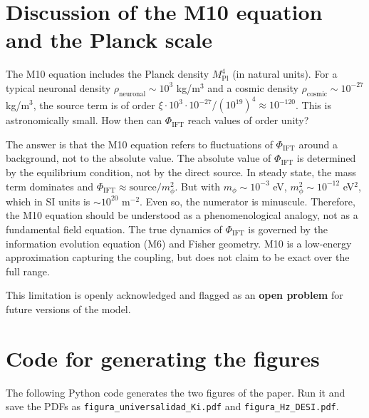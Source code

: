 \documentclass[12pt, a4paper]{article}
\theoremstyle{miuThm}
\theoremstyle{remark}
\begin{document}
\clearpage
\section{Discussion of the M10 equation and the Planck scale}

The M10 equation includes the Planck density $M_{\text{Pl}}^4$ (in natural units). For a typical neuronal density $\rho_{\text{neuronal}} \sim 10^3$ kg/m$^3$ and a cosmic density $\rho_{\text{cosmic}} \sim 10^{-27}$ kg/m$^3$, the source term is of order $\xi \cdot 10^3 \cdot 10^{-27} / (10^{19})^4 \approx 10^{-120}$. This is astronomically small. How then can $\Phi_{\text{IFT}}$ reach values of order unity?

The answer is that the M10 equation refers to fluctuations of $\Phi_{\text{IFT}}$ around a background, not to the absolute value. The absolute value of $\Phi_{\text{IFT}}$ is determined by the equilibrium condition, not by the direct source. In steady state, the mass term dominates and $\Phi_{\text{IFT}} \approx \text{source} / m_\phi^2$. But with $m_\phi \sim 10^{-3}$ eV, $m_\phi^2 \sim 10^{-12}$ eV$^2$, which in SI units is $\sim 10^{20}$ m$^{-2}$. Even so, the numerator is minuscule. Therefore, the M10 equation should be understood as a phenomenological analogy, not as a fundamental field equation. The true dynamics of $\Phi_{\text{IFT}}$ is governed by the information evolution equation (M6) and Fisher geometry. M10 is a low-energy approximation capturing the coupling, but does not claim to be exact over the full range.

This limitation is openly acknowledged and flagged as an \textbf{open problem} for future versions of the model.

\clearpage
\section{Code for generating the figures}

The following Python code generates the two figures of the paper. Run it and save the PDFs as \texttt{figura\_universalidad\_Ki.pdf} and \texttt{figura\_Hz\_DESI.pdf}.
\end{document}
